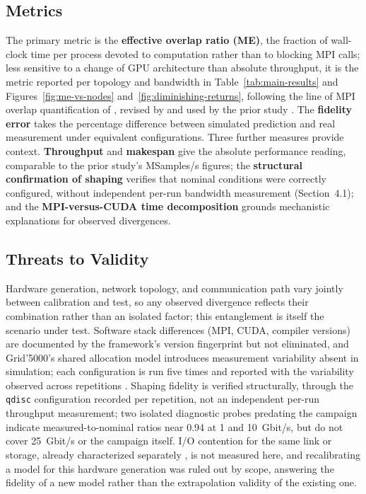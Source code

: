 \documentclass[12pt]{article}
\begin{document}
\subsection{Metrics}
 
The primary metric is the \textbf{effective overlap ratio (ME)}, the fraction of wall-clock time per process devoted to computation rather than to blocking MPI calls; less sensitive to a change of GPU architecture than absolute throughput, it is the metric reported per topology and bandwidth in Table~\ref{tab:main-results} and Figures~\ref{fig:me-vs-nodes} and~\ref{fig:diminishing-returns}, following the line of MPI overlap quantification of \cite{denis2016overlap}, revised by \cite{medvedev2022imbasync} and used by the prior study \cite{spadotto2026carla}. The \textbf{fidelity error} takes the percentage difference between simulated prediction and real measurement under equivalent configurations. Three further measures provide context. \textbf{Throughput} and \textbf{makespan} give the absolute performance reading, comparable to the prior study's MSamples/s figures; the \textbf{structural confirmation of shaping} verifies that nominal conditions were correctly configured, without independent per-run bandwidth measurement (Section~4.1); and the \textbf{MPI-versus-CUDA time decomposition} grounds mechanistic explanations for observed divergences.
 
\subsection{Threats to Validity}
 
Hardware generation, network topology, and communication path vary jointly between calibration and test, so any observed divergence reflects their combination rather than an isolated factor; this entanglement is itself the scenario under test. Software stack differences (MPI, CUDA, compiler versions) are documented by the framework's version fingerprint but not eliminated, and Grid'5000's shared allocation model introduces measurement variability absent in simulation; each configuration is run five times and reported with the variability observed across repetitions \cite{hoefler2015benchmarking}. Shaping fidelity is verified structurally, through the \texttt{qdisc} configuration recorded per repetition, not an independent per-run throughput measurement; two isolated diagnostic probes predating the campaign indicate measured-to-nominal ratios near 0.94 at 1 and 10~Gbit/s, but do not cover 25~Gbit/s or the campaign itself. I/O contention for the same link or storage, already characterized separately \cite{kunas2024enhancing,kunas2025compressao}, is not measured here, and recalibrating a model for this hardware generation was ruled out by scope, answering the fidelity of a new model rather than the extrapolation validity of the existing one.
\end{document}
